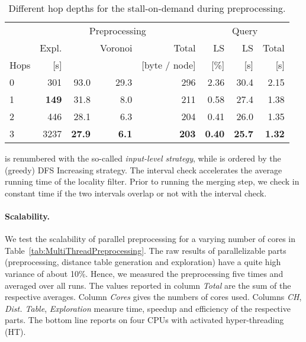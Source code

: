 \documentclass{llncs}
\begin{document}
\begin{table}[b]
\caption{Different hop depths for the stall-on-demand during preprocessing.}
\label{tab:StallOnDemand}
\centering
\begin{tabular}{lrrrrrrr}
\toprule
 	& \multicolumn{4}{c}{Preprocessing} & \multicolumn{3}{c}{Query} \\
 		\cmidrule(lr){2-5} \cmidrule(lr){6-8}
	& Expl.	&  & Voronoi & Total & LS & LS & Total\\
Hops & [s] &  &  & [byte / node] & [\%] & [s] & [s]\\
\midrule 
0	& 301			& 93.0 			& 29.3 			& 296 		& 2.36 & 30.4 & 2.15 \\
1 	& \textbf{149} 	& 31.8 			& 8.0 			& 211 		& 0.58 & 27.4 & 1.38 \\ 
2	& 446 			& 28.1 			& 6.3 			& 204 		& 0.41 & 26.0 & 1.35 \\ 
3 	& 3237 			& \textbf{27.9} & \textbf{6.1} & \textbf{203} & \textbf{0.40} & \textbf{25.7} & \textbf{1.32} \\ 
\bottomrule 
\end{tabular}
\end{table}

 is renumbered with the so-called \textit{input-level strategy}, while  is ordered by the (greedy) DFS Increasing strategy.
The interval check accelerates the average running time of the locality filter. 
Prior to running the merging step, we check in constant time if the two intervals overlap or not with the interval check. 

\paragraph{Scalability.}
We test the scalability of parallel preprocessing for a varying number of cores in
Table~\ref{tab:MultiThreadPreprocessing}. 
The raw results of parallelizable parts (preprocessing, distance table generation and exploration) have a quite high variance of about 10\%. 
Hence, we measured the preprocessing five times and averaged over all runs. 
The values reported in column \emph{Total} are the sum of the respective averages.
Column \emph{Cores} gives the numbers of cores used.
Columns \emph{CH}, \emph{Dist. Table}, \emph{Exploration} measure time, speedup and efficiency of the respective parts.
The bottom line reports on four CPUs with activated hyper-threading (HT).
\end{document}
